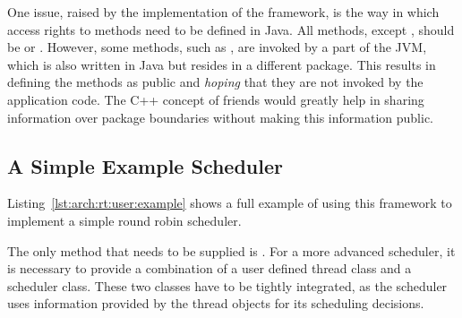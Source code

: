One issue, raised by the implementation of the framework, is the way
in which access rights to methods need to be defined in Java. All
methods, except , should be  or
. However, some methods, such as ,
are invoked by a part of the JVM, which is also written in Java but
resides in a different package. This results in defining the methods
as public and \emph{hoping} that they are not invoked by the
application code. The C++ concept of friends would greatly help in
sharing information over package boundaries without making this
information public.

\subsection{A Simple Example Scheduler}

Listing~\ref{lst:arch:rt:user:example} shows a full example of using
this framework to implement a simple round robin scheduler.

The only method that needs to be supplied is . For
a more advanced scheduler, it is necessary to provide a combination
of a user defined thread class and a scheduler class. These two
classes have to be tightly integrated, as the scheduler uses
information provided by the thread objects for its scheduling
decisions.


